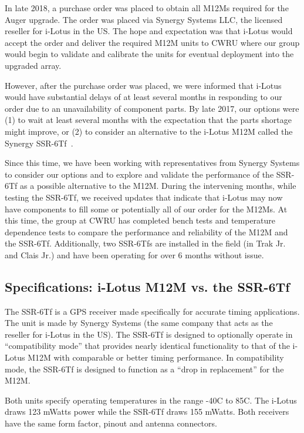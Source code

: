 In late 2018, a purchase order was placed to obtain all M12Ms required
for the Auger upgrade.  The order was placed via Synergy Systems
LLC, the licensed reseller for i-Lotus in the US. The
hope and expectation was that i-Lotus would accept the order and
deliver the required M12M units to CWRU where our group would begin to validate and
calibrate the units for eventual deployment into the upgraded
array.

However, after the purchase order was placed, we were informed that
i-Lotus would have substantial delays of at least several months in
responding to our order due to an unavailability of component parts.
By late 2017, our options were (1) to wait at least several months
with the expectation that the parts shortage might improve, or (2) to
consider an alternative to the i-Lotus M12M called the Synergy SSR-6Tf~\cite{ssr}.

Since this time, we have been working with representatives from
Synergy Systems to consider our options and to explore and validate
the performance of the SSR-6Tf as a possible alternative to the M12M.
During the intervening months, while testing the SSR-6Tf, we
received updates that indicate that i-Lotus may now have components to
fill some or potentially all of our order for the M12Ms.  At this time, the group at
CWRU has completed bench tests and temperature dependence tests to
compare the performance and reliability of the M12M and the SSR-6Tf. Additionally, two SSR-6Tfs are installed in the field (in Trak Jr. and Clais Jr.) and have been operating for over 6 months without issue.

\subsection{Specifications:  i-Lotus M12M vs. the SSR-6Tf}%
\label{receivers}
The SSR-6Tf is a GPS receiver made specifically for accurate timing
applications.  The unit is made by Synergy Systems (the same company
that acts as the reseller for i-Lotus in the US).  The SSR-6Tf is designed to
optionally operate in ``compatibility mode'' that provides nearly
identical functionality to that of the i-Lotus M12M with comparable or
better timing performance.  In compatibility mode, the SSR-6Tf is
designed to function as a ``drop in replacement'' for the
M12M. 

Both units specify operating temperatures in the range -40C to 85C.
The i-Lotus draws 123 mWatts power while the SSR-6Tf draws 155 mWatts.
Both receivers have the same form factor, pinout and antenna
connectors.

